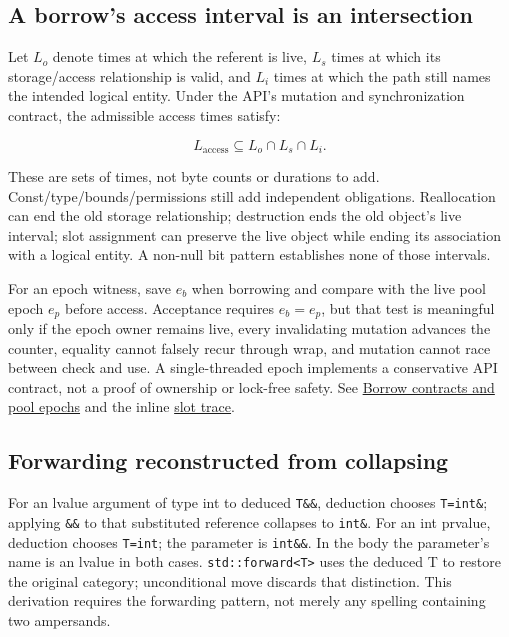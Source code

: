 \subsection{A borrow's access interval is an intersection}\label{01-foundations-i-ch011-a-borrows-access-interval-is-an-intersection}

Let \(L_o\) denote times at which the referent is live, \(L_s\) times at which its storage/access relationship is valid, and \(L_i\) times at which the path still names the intended logical entity. Under the API's mutation and synchronization contract, the admissible access times satisfy:

\[
L_{\mathrm{access}}\subseteq L_o\cap L_s\cap L_i.
\]

These are sets of times, not byte counts or durations to add. Const/type/bounds/permissions still add independent obligations. Reallocation can end the old storage relationship; destruction ends the old object's live interval; slot assignment can preserve the live object while ending its association with a logical entity. A non-null bit pattern establishes none of those intervals.

For an epoch witness, save \(e_b\) when borrowing and compare with the live pool epoch \(e_p\) before access. Acceptance requires \(e_b=e_p\), but that test is meaningful only if the epoch owner remains live, every invalidating mutation advances the counter, equality cannot falsely recur through wrap, and mutation cannot race between check and use. A single-threaded epoch implements a conservative API contract, not a proof of ownership or lock-free safety. See \hyperref[appendix-aa405b7c3903]{Borrow contracts and pool epochs} and the inline \hyperref[01-foundations-i-ch003-when-a-valid-borrow-stops-naming-the-intended-thing]{slot trace}.

\subsection{Forwarding reconstructed from collapsing}\label{01-foundations-i-ch011-forwarding-reconstructed-from-collapsing}

For an lvalue argument of type int to deduced \texttt{T\&\&}, deduction chooses \texttt{T=int\&}; applying \texttt{\&\&} to that substituted reference collapses to \texttt{int\&}. For an int prvalue, deduction chooses \texttt{T=int}; the parameter is \texttt{int\&\&}. In the body the parameter's name is an lvalue in both cases. \texttt{std::forward\textless{}T\textgreater{}} uses the deduced T to restore the original category; unconditional move discards that distinction. This derivation requires the forwarding pattern, not merely any spelling containing two ampersands.

